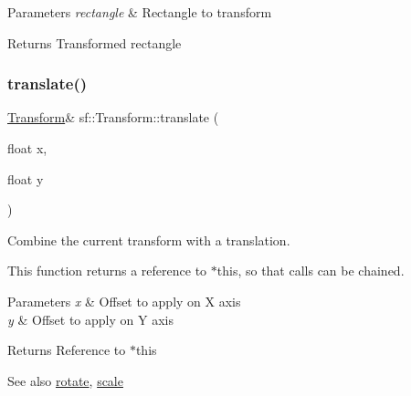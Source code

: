 \begin{DoxyParams}{Parameters}
{\em rectangle} & Rectangle to transform\\
\hline
\end{DoxyParams}
\begin{DoxyReturn}{Returns}
Transformed rectangle \begin{DoxyVerb}\end{DoxyVerb}
 
\end{DoxyReturn}
\mbox{\label{classsf_1_1_transform_ab54f6c8070cc05e2afcb3145fbf4395a}} 
\subsubsection{\texorpdfstring{translate()}{translate()}\hspace{0.1cm}{\footnotesize\ttfamily [1/2]}}
{\footnotesize\ttfamily \mbox{\hyperlink{classsf_1_1_transform}{Transform}}\& sf\+::\+Transform\+::translate (\begin{DoxyParamCaption}\item[{float}]{x,  }\item[{float}]{y }\end{DoxyParamCaption})}



Combine the current transform with a translation. 

This function returns a reference to $\ast$this, so that calls can be chained. 
\begin{DoxyCode}{0}
\end{DoxyCode}



\begin{DoxyParams}{Parameters}
{\em x} & Offset to apply on X axis \\
\hline
{\em y} & Offset to apply on Y axis\\
\hline
\end{DoxyParams}
\begin{DoxyReturn}{Returns}
Reference to $\ast$this
\end{DoxyReturn}
\begin{DoxySeeAlso}{See also}
\mbox{\hyperlink{classsf_1_1_transform_a3e548c3c9e3fb9d4bd43cf852669e555}{rotate}}, \mbox{\hyperlink{classsf_1_1_transform_a3f46af807f69d74120fb836334268671}{scale}} \begin{DoxyVerb}\end{DoxyVerb}
 
\end{DoxySeeAlso}
\mbox{\label{classsf_1_1_transform_a452ff6e32d5120fa8c132c1bf0ad83cd}} 
